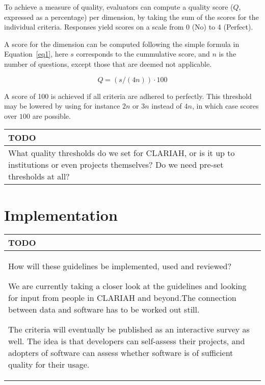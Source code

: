 \documentclass[a4paper,11pt]{article}
\newenvironment{TODO}{
\begin{center}
    \begin{tabular}[h!]{|p{0.8\textwidth}|}
    \hline
    {\bf TODO}\\\hline}
{   \\\hline
    \end{tabular}
\end{center}}
\begin{document}
To achieve a measure of quality, evaluators can compute a quality score ($Q$,
expressed as a percentage) per dimension, by taking the sum of the scores for
the individual criteria. Responses yield scores on a scale from 0 (No) to 4 (Perfect). 

A score for the dimension can be computed following the simple formula in
Equation~\ref{eq1}, here $s$ corresponds to the cummulative score, and $n$ is
the number of questions, except those that are deemed not applicable.

\begin{equation}
\label{eq1}
Q = (s / (4n)) \cdot 100
\end{equation}

A score of 100 is achieved if all criteria are adhered to perfectly. This
threshold may be lowered by using for instance $2n$ or $3n$ instead of $4n$, in
which case scores over $100$ are possible.

\begin{TODO}
What quality thresholds do we set for CLARIAH, or is it up
to institutions or even projects themselves? Do we need pre-set thresholds at
all?
\end{TODO}



\section{Implementation}

\begin{TODO}
How will these guidelines be implemented, used and reviewed?

We are currently taking a closer look at the guidelines and looking for input
from people in CLARIAH and beyond.The connection between data and software has
to be worked out still.

The criteria will eventually be published as an interactive
survey as well. The idea is that developers can self-assess their projects, and
adopters of software can assess whether software is of sufficient quality for
their usage.
\end{TODO}
\end{document}
